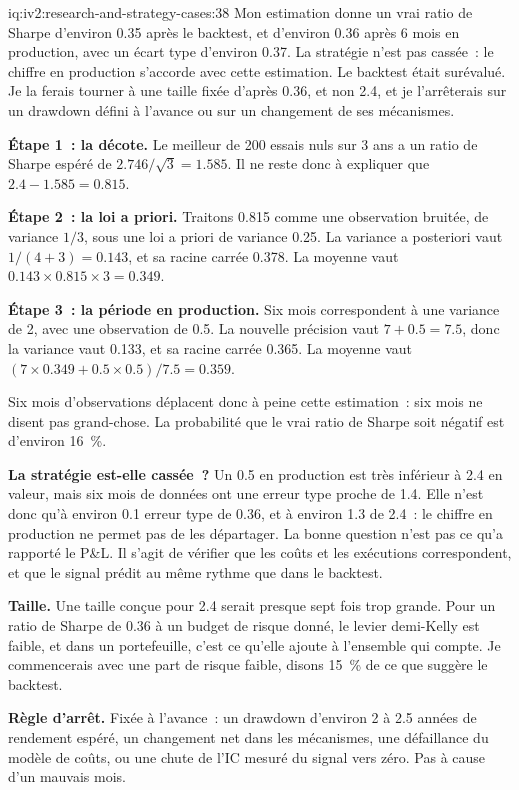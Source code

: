 \begin{solution}{iq:iv2:research-and-strategy-cases:38}
Mon estimation donne un vrai ratio de Sharpe d'environ 0.35 après le backtest, et d'environ 0.36 après 6 mois en production, avec un écart type d'environ 0.37. La stratégie n'est pas cassée~: le chiffre en production s'accorde avec cette estimation. Le backtest était surévalué. Je la ferais tourner à une taille fixée d'après 0.36, et non 2.4, et je l'arrêterais sur un drawdown défini à l'avance ou sur un changement de ses mécanismes.

\textbf{Étape 1~: la décote.} Le meilleur de 200 essais nuls sur 3 ans a un ratio de Sharpe espéré de $2.746/\sqrt{3} = 1.585$. Il ne reste donc à expliquer que $2.4 - 1.585 = 0.815$.

\textbf{Étape 2~: la loi a priori.} Traitons 0.815 comme une observation bruitée, de variance $1/3$, sous une loi a priori de variance 0.25. La variance a posteriori vaut $1/(4 + 3) = 0.143$, et sa racine carrée 0.378. La moyenne vaut $0.143 \times 0.815 \times 3 = 0.349$.

\textbf{Étape 3~: la période en production.} Six mois correspondent à une variance de 2, avec une observation de 0.5. La nouvelle précision vaut $7 + 0.5 = 7.5$, donc la variance vaut 0.133, et sa racine carrée 0.365. La moyenne vaut $(7 \times 0.349 + 0.5 \times 0.5)/7.5 = 0.359$.

Six mois d'observations déplacent donc à peine cette estimation~: six mois ne disent pas grand-chose. La probabilité que le vrai ratio de Sharpe soit négatif est d'environ 16~\%.

\textbf{La stratégie est-elle cassée~?} Un 0.5 en production est très inférieur à 2.4 en valeur, mais six mois de données ont une erreur type proche de 1.4. Elle n'est donc qu'à environ 0.1 erreur type de 0.36, et à environ 1.3 de 2.4~: le chiffre en production ne permet pas de les départager. La bonne question n'est pas ce qu'a rapporté le P\&L. Il s'agit de vérifier que les coûts et les exécutions correspondent, et que le signal prédit au même rythme que dans le backtest.

\textbf{Taille.} Une taille conçue pour 2.4 serait presque sept fois trop grande. Pour un ratio de Sharpe de 0.36 à un budget de risque donné, le levier demi-Kelly est faible, et dans un portefeuille, c'est ce qu'elle ajoute à l'ensemble qui compte. Je commencerais avec une part de risque faible, disons 15~\% de ce que suggère le backtest.

\textbf{Règle d'arrêt.} Fixée à l'avance~: un drawdown d'environ 2 à 2.5 années de rendement espéré, un changement net dans les mécanismes, une défaillance du modèle de coûts, ou une chute de l'IC mesuré du signal vers zéro. Pas à cause d'un mauvais mois.


\end{solution}

